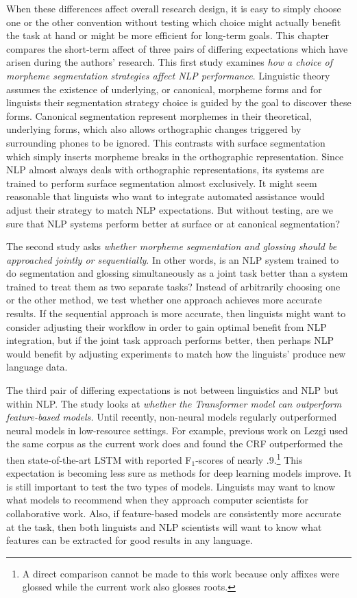 When these differences affect overall research design, it is easy to simply choose one or the other convention without testing which choice might actually benefit the task at hand or might be more efficient for long-term goals. This chapter compares the short-term affect of three pairs of differing expectations which have arisen during the authors' research. 
This first study examines \textit{how a choice of morpheme segmentation strategies affect NLP performance}. Linguistic theory assumes the existence of underlying, or canonical, morpheme forms and for linguists their segmentation strategy choice is guided by the goal to discover these forms. Canonical segmentation represent morphemes in their theoretical, underlying forms, which also allows orthographic changes triggered by surrounding phones to be ignored. This contrasts with surface segmentation which simply inserts morpheme breaks in the orthographic representation. Since NLP almost always deals with orthographic representations, its systems are trained to perform surface segmentation almost exclusively. 
It might seem reasonable that linguists who want to integrate automated assistance would adjust their strategy to match NLP expectations. But without testing, are we sure that NLP systems perform better at surface or at canonical segmentation?

The second study asks \textit{whether morpheme segmentation and glossing should be approached jointly or sequentially}. In other words, is an NLP system trained to do segmentation and glossing simultaneously as a joint task better than a system trained to treat them as two separate tasks? Instead of arbitrarily choosing one or the other method, we test whether one approach achieves more accurate results. If the sequential approach is more accurate, then linguists might want to consider adjusting their workflow in order to gain optimal benefit from NLP integration, but if the joint task approach performs better, then perhaps NLP would benefit by adjusting experiments to match how the linguists' produce new language data.

The third pair of differing expectations is not between linguistics and NLP but within NLP. The study looks at \textit{whether the Transformer model can outperform feature-based models.} Until recently, non-neural models regularly outperformed neural models in low-resource settings. For example, previous work on Lezgi \citep{moeller_automatic_2018} used the same corpus as the current work does and found the CRF outperformed the then state-of-the-art LSTM with reported F$_1$-scores of nearly .9.\footnote{A direct comparison cannot be made to this work because only affixes were glossed while the current work also glosses roots.} This expectation is becoming less sure as methods for deep learning models improve. It is still important to test the two types of models. Linguists may want to know what models to recommend when they approach computer scientists for collaborative work. Also, if feature-based models are consistently more accurate at the task, then both linguists and NLP scientists will want to know what features can be extracted for good results in any language. 


